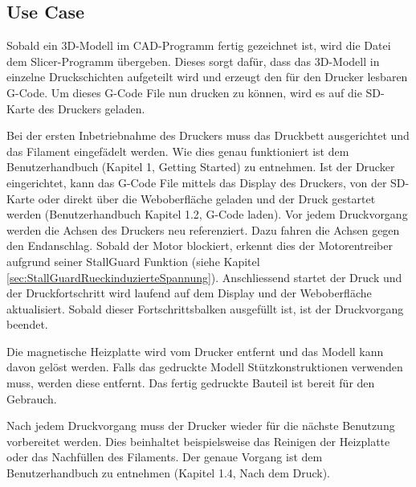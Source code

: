 \subsection{Use Case}
\label{sec:UseCase}

Sobald ein 3D-Modell im CAD-Programm fertig gezeichnet ist, wird die Datei dem Slicer-Programm übergeben. Dieses sorgt dafür, dass das 3D-Modell in einzelne Druckschichten aufgeteilt wird und erzeugt den für den Drucker lesbaren G-Code. Um dieses G-Code File nun drucken zu können, wird es auf die SD-Karte des Druckers geladen. 

Bei der ersten Inbetriebnahme des Druckers muss das Druckbett ausgerichtet und das Filament eingefädelt werden. Wie dies genau funktioniert ist dem Benutzerhandbuch (Kapitel 1, Getting Started) zu entnehmen. Ist der Drucker eingerichtet, kann das G-Code File mittels das Display des Druckers, von der SD-Karte oder direkt über die Weboberfläche geladen und der Druck gestartet werden (Benutzerhandbuch Kapitel 1.2, G-Code laden). Vor jedem Druckvorgang werden die Achsen des Druckers neu referenziert. Dazu fahren die Achsen gegen den Endanschlag. Sobald der Motor blockiert, erkennt dies der Motorentreiber aufgrund seiner StallGuard Funktion (siehe Kapitel \ref{sec:StallGuardRueckinduzierteSpannung}). Anschliessend startet der Druck und der Druckfortschritt wird laufend auf dem Display und der Weboberfläche aktualisiert. Sobald dieser Fortschrittsbalken ausgefüllt ist, ist der Druckvorgang beendet.

Die magnetische Heizplatte wird vom Drucker entfernt und das Modell kann davon gelöst werden. Falls das gedruckte Modell Stützkonstruktionen verwenden muss, werden diese entfernt. Das fertig gedruckte Bauteil ist bereit für den Gebrauch.

Nach jedem Druckvorgang muss der Drucker wieder für die nächste Benutzung vorbereitet werden. Dies beinhaltet beispielsweise das Reinigen der Heizplatte oder das Nachfüllen des Filaments. Der genaue Vorgang ist dem Benutzerhandbuch zu entnehmen (Kapitel 1.4, Nach dem Druck).